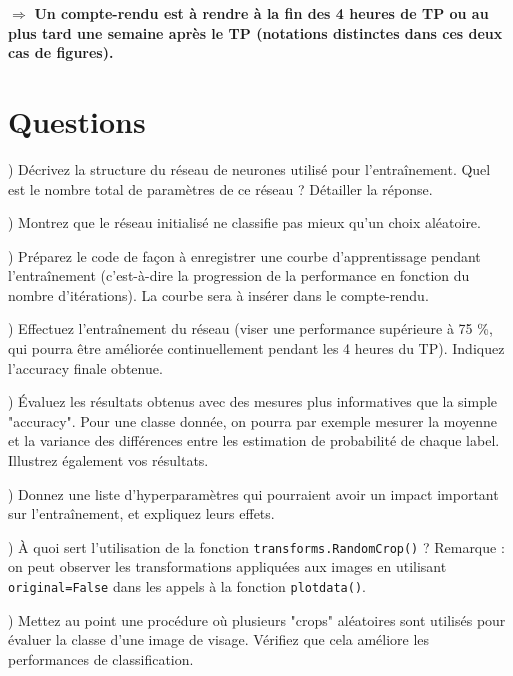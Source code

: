 \documentclass[a4paper,11pt]{article}
\begin{document}
$\Rightarrow$ \textbf{Un compte-rendu est à rendre à la fin des 4 heures de TP ou au plus tard une semaine après le TP (notations distinctes dans ces deux cas de figures).}

\section{Questions}

) Décrivez la structure du réseau de neurones utilisé pour l'entraînement. Quel est le nombre total de paramètres de ce réseau ? Détailler la réponse. 
\newline

) Montrez que le réseau initialisé ne classifie pas mieux qu'un choix aléatoire.
\newline

) Préparez le code de façon à enregistrer une courbe d'apprentissage pendant l'entraînement (c'est-à-dire la progression de la performance en fonction du nombre d'itérations). La courbe sera à insérer dans le compte-rendu.
\newline

) Effectuez l'entraînement du réseau (viser une performance supérieure à 75 \%, qui pourra être améliorée continuellement pendant les 4 heures du TP). Indiquez l'accuracy finale obtenue.
\newline

) Évaluez les résultats obtenus avec des mesures 
plus informatives que la simple "accuracy". Pour une classe donnée, on pourra par exemple
mesurer la moyenne et la variance des différences entre les estimation de probabilité de chaque label. Illustrez également vos résultats.
\newline

) Donnez une liste d'hyperparamètres qui pourraient avoir un impact important sur l'entraînement, et expliquez leurs effets.
\newline

) À quoi sert l'utilisation de la fonction \texttt{transforms.RandomCrop()} ?
Remarque : on peut observer les transformations appliquées aux images en utilisant \texttt{original=False} dans les appels à la fonction \texttt{plotdata()}.
\newline

) Mettez au point une procédure où plusieurs "crops" aléatoires sont utilisés pour évaluer la classe d'une image de visage. Vérifiez que cela améliore les performances de classification.
\newline
\end{document}
